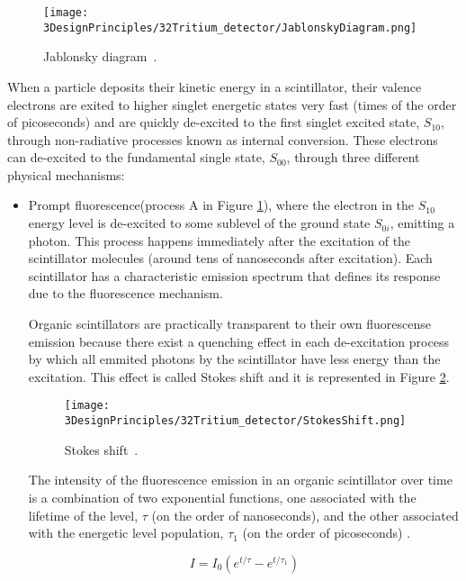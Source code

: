 \begin{figure}[htbp]
\centering
\texttt{[image: 3DesignPrinciples/32Tritium\_detector/JablonskyDiagram.png]}
\caption{Jablonsky diagram\label{fig:JablonskyDiagram}~\cite{Knoll}.}
\end{figure}

When a particle deposits their kinetic energy in a scintillator, their valence electrons are exited to higher singlet energetic states very fast (times of the order of picoseconds) and are quickly de-excited to the first singlet excited state, $S_{10}$, through non-radiative processes known as internal conversion. These electrons can de-excited to the fundamental single state, $S_{00}$, through three different physical mechanisms:

\begin{itemize}

\item{} Prompt fluorescence(process A in Figure \ref{fig:JablonskyDiagram}), where the electron in the $S_{10}$ energy level  is de-excited to some sublevel of the ground state $S_{0i}$, emitting a photon. This process happens immediately after the excitation of the scintillator molecules (around tens of nanoseconds after excitation). Each scintillator has a characteristic emission spectrum that defines its response due to the fluorescence mechanism. 

Organic scintillators are practically transparent to their own fluorescense emission because there exist a quenching effect in each de-excitation process by which all emmited  photons by the scintillator have less energy than the excitation. This effect is called Stokes shift and it is represented in Figure \ref{fig:StokesShift}.

\begin{figure}[htbp]
\centering
\texttt{[image: 3DesignPrinciples/32Tritium\_detector/StokesShift.png]}
\caption{Stokes shift\label{fig:StokesShift}~\cite{Knoll}.}
\end{figure}

The intensity of the fluorescence emission in an organic scintillator over time is a combination of two exponential functions, one associated with the lifetime of the level, $\tau$ (on the order of nanoseconds), and the other associated with the energetic level population, $\tau_1$ (on the order of picoseconds) \cite{Knoll}.

\begin{equation}
I=I_0\left(e^{t/\tau} - e^{t/\tau_1}\right) 
\label{eq:IntensityTimeScintillator}
\end{equation}


\end{itemize}
